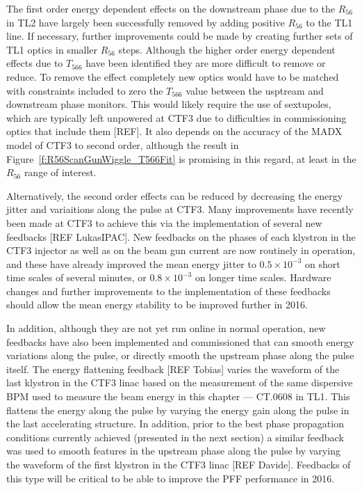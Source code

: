 The first order energy dependent effects on the downstream phase due to the \(R_{56}\) in TL2 have largely been successfully removed by adding positive \(R_{56}\) to the TL1 line. If necessary, further improvements could be made by creating further sets of TL1 optics in smaller \(R_{56}\) steps. Although the higher order energy dependent effects due to \(T_{566}\) have been identified they are more difficult to remove or reduce. To remove the effect completely new optics would have to be matched with constraints included to zero the \(T_{566}\) value between the usptream and downstream phase monitors. This would likely require the use of sextupoles, which are typically left unpowered at CTF3 due to difficulties in commissioning optics that include them [REF]. It also depends on the accuracy of the MADX model of CTF3 to second order, although the result in Figure~\ref{f:R56ScanGunWiggle_T566Fit} is promising in this regard, at least in the \(R_{56}\) range of interest.

Alternatively, the second order effects can be reduced by decreasing the energy jitter and variaitions along the pulse at CTF3. Many improvements have recently been made at CTF3 to achieve this via the implementation of several new feedbacks [REF LukasIPAC]. New feedbacks on the phases of each klystron in the CTF3 injector as well as on the beam gun current are now routinely in operation, and these have already improved the mean energy jitter to \(0.5\times10^{-3}\) on short time scales of several minutes, or \(0.8\times10^{-3}\) on longer time scales. Hardware changes and further improvements to the implementation of these feedbacks should allow the mean energy stability to be improved further in 2016.

In addition, although they are not yet run online in normal operation, new feedbacks have also been implemented and commissioned that can smooth energy variations along the pulse, or directly smooth the upstream phase along the pulse itself. The energy flattening feedback [REF Tobias] varies the waveform of the last klystron in the CTF3 linac based on the measurement of the same dispersive BPM used to measure the beam energy in this chapter --- CT.0608 in TL1. This flattens the energy along the pulse by varying the energy gain along the pulse in the last accelerating structure. In addition, prior to the best phase propagation conditions currently achieved (presented in the next section) a similar feedback was used to smooth features in the upstream phase along the pulse by varying the waveform of the first klystron in the CTF3 linac [REF Davide]. Feedbacks of this type will be critical to be able to improve the PFF performance in 2016.


